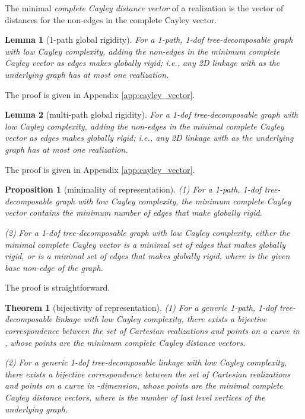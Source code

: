\documentclass[secthm,amsthm,english]{article}
\newtheorem{theorem}{Theorem}
\newtheorem{lemma}{Lemma}
\newtheorem{proposition}{Proposition}
\theoremstyle{definition}
\theoremstyle{remark}
\begin{document}
The minimal \emph{complete Cayley distance vector} of a realization 
is the vector of distances for the non-edges in the complete Cayley vector. 

\smallskip

\begin{lemma}[1-path global rigidity] \label{lem:globally_rigid_1path}
For a 1-path, 1-dof tree-decomposable graph  with low Cayley complexity, 
adding the non-edges in the minimum complete Cayley vector as edges 
makes  \emph{globally rigid}; i.e., 
any 2D linkage with  as the underlying graph has at most one realization. 
\end{lemma}


The proof is given in Appendix \ref{app:cayley_vector}.


\smallskip

\begin{lemma}[multi-path global rigidity] \label{lem:globally_rigid_multi}
For a 1-dof tree-decomposable graph  with low Cayley complexity, 
adding the non-edges in the minimal complete Cayley vector as edges 
makes  \emph{globally rigid}; i.e., 
any 2D linkage with  as the underlying graph has at most one realization. 
\end{lemma}

The proof is given in Appendix \ref{app:cayley_vector}.


\smallskip

\begin{proposition}[minimality of representation]
\noindent (1) 
For a 1-path, 1-dof tree-decomposable graph with low Cayley complexity,
 the minimum complete Cayley vector  contains the minimum number of edges that make  globally rigid.

\noindent (2) 
For a 1-dof tree-decomposable graph with low Cayley complexity,
either the minimal complete Cayley vector  is a minimal set of edges that makes  globally rigid, 
or  is a minimal set of edges that makes  globally rigid,
where  is the given base non-edge of the graph.
\end{proposition}

The proof is straightforward.




\smallskip

\begin{theorem}[bijectivity of representation] \label{thm:parameterize}
\noindent (1)
For a generic 1-path, 1-dof tree-decomposable linkage with low Cayley complexity, 
there exists a bijective correspondence between the set of Cartesian realizations and 
points on a curve in , whose points are the minimum complete Cayley distance vectors. 

\noindent (2)
For a generic 1-dof tree-decomposable linkage with low Cayley complexity, 
there exists a bijective correspondence between the set of Cartesian realizations and 
points on a curve in -dimension, whose points are the minimal complete Cayley distance vectors, 
where  is the number of last level vertices of the underlying graph. 
\end{theorem}
\end{document}
